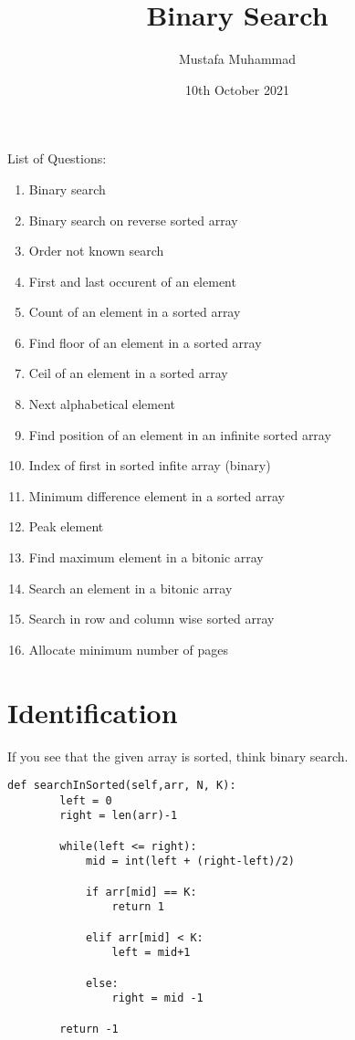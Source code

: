 \documentclass[24pt, a4]{article}
\title{Binary Search}
\author{Mustafa Muhammad}
\date{10th October 2021}
\begin{document}
\maketitle

\newpage

List of Questions:
\begin{enumerate}
    \item Binary search
    \item Binary search on reverse sorted array
    \item Order not known search
    \item First and last occurent of an element
    \item Count of an element in a sorted array
    \item Find floor of an element in a sorted array
    \item Ceil of an element in a sorted array
    \item Next alphabetical element
    \item Find position of an element in an infinite sorted array
    \item Index of first in sorted infite array (binary)
    \item Minimum difference element in a sorted array
    \item Peak element
    \item Find maximum element in a bitonic array
    \item Search an element in a bitonic array
    \item Search in row and column wise sorted array
    \item Allocate minimum number of pages
    \end{enumerate}

\newpage
\section{Identification}
If you see that the given array is sorted, think binary search.
\begin{lstlisting}
def searchInSorted(self,arr, N, K):
        left = 0
        right = len(arr)-1

        while(left <= right):
            mid = int(left + (right-left)/2)

            if arr[mid] == K:
                return 1

            elif arr[mid] < K:
                left = mid+1

            else:
                right = mid -1

        return -1
\end{lstlisting}
\end{document}
